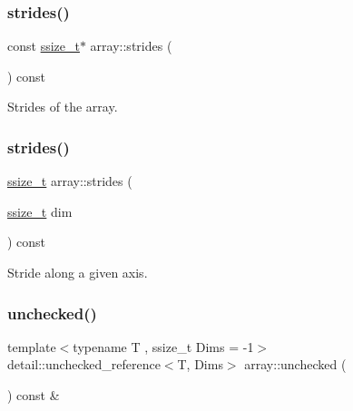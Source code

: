 \mbox{\label{classarray_a3dd7d4e8f6d93e5714a642a3250df6e3}} 
\subsubsection{\texorpdfstring{strides()}{strides()}\hspace{0.1cm}{\footnotesize\ttfamily [1/2]}}
{\footnotesize\ttfamily const \mbox{\hyperlink{detail_2common_8h_ac430d16fc097b3bf0a7469cfd09decda}{ssize\+\_\+t}}$\ast$ array\+::strides (\begin{DoxyParamCaption}{ }\end{DoxyParamCaption}) const\hspace{0.3cm}{\ttfamily [inline]}}



Strides of the array. 

\mbox{\label{classarray_afb8e09341f7884d6b34d454b2992c7ce}} 
\subsubsection{\texorpdfstring{strides()}{strides()}\hspace{0.1cm}{\footnotesize\ttfamily [2/2]}}
{\footnotesize\ttfamily \mbox{\hyperlink{detail_2common_8h_ac430d16fc097b3bf0a7469cfd09decda}{ssize\+\_\+t}} array\+::strides (\begin{DoxyParamCaption}\item[{\mbox{\hyperlink{detail_2common_8h_ac430d16fc097b3bf0a7469cfd09decda}{ssize\+\_\+t}}}]{dim }\end{DoxyParamCaption}) const\hspace{0.3cm}{\ttfamily [inline]}}



Stride along a given axis. 

\mbox{\label{classarray_a453dfcd16f86df11e0a6ede98b04b7a0}} 
\subsubsection{\texorpdfstring{unchecked()}{unchecked()}}
{\footnotesize\ttfamily template$<$typename T , ssize\+\_\+t Dims = -\/1$>$ \\
detail\+::unchecked\+\_\+reference$<$T, Dims$>$ array\+::unchecked (\begin{DoxyParamCaption}{ }\end{DoxyParamCaption}) const \&\hspace{0.3cm}{\ttfamily [inline]}}

